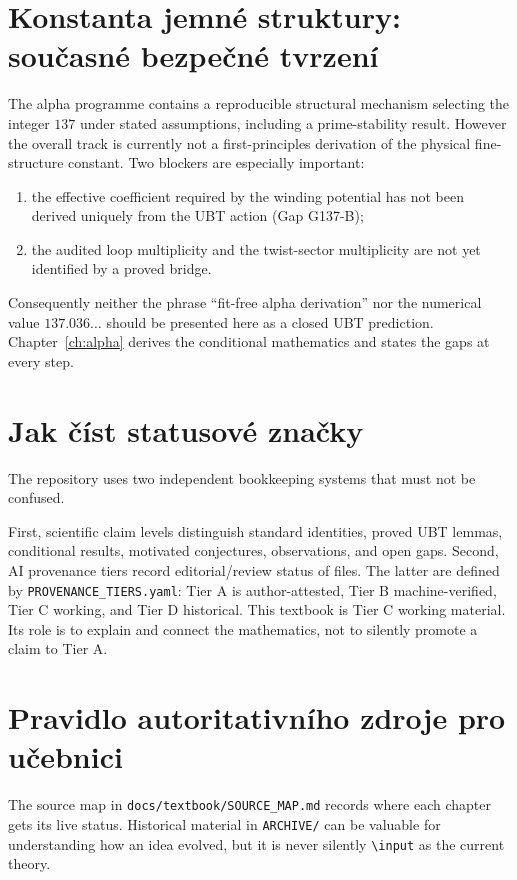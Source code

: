\section{Konstanta jemné struktury: současné bezpečné tvrzení}
The alpha programme contains a reproducible structural mechanism selecting the
integer $137$ under stated assumptions, including a prime-stability result.
However the overall track is currently not a first-principles derivation of the
physical fine-structure constant.  Two blockers are especially important:
\begin{enumerate}
 \item the effective coefficient required by the winding potential has not been
       derived uniquely from the UBT action (Gap G137-B);
 \item the audited loop multiplicity and the twist-sector multiplicity are not
       yet identified by a proved bridge.
\end{enumerate}
Consequently neither the phrase ``fit-free alpha derivation'' nor the numerical
value $137.036\ldots$ should be presented here as a closed UBT prediction.
Chapter~\ref{ch:alpha} derives the conditional mathematics and states the gaps
at every step.

\section{Jak číst statusové značky}
The repository uses two independent bookkeeping systems that must not be
confused.

First, scientific claim levels distinguish standard identities, proved UBT
lemmas, conditional results, motivated conjectures, observations, and open
gaps.  Second, AI provenance tiers record editorial/review status of files.
The latter are defined by \texttt{PROVENANCE\_TIERS.yaml}:
Tier A is author-attested, Tier B machine-verified, Tier C working, and Tier D
historical.  This textbook is Tier C working material.  Its role is to explain
and connect the mathematics, not to silently promote a claim to Tier A.

\section{Pravidlo autoritativního zdroje pro učebnici}
The source map in \texttt{docs/textbook/SOURCE\_MAP.md} records where each
chapter gets its live status.  Historical material in \texttt{ARCHIVE/} can be
valuable for understanding how an idea evolved, but it is never silently
\texttt{\textbackslash input} as the current theory.

